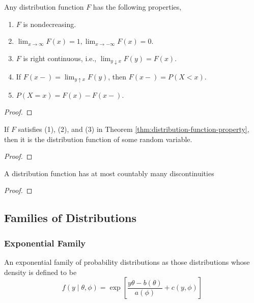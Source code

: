 \begin{theorem} \label{thm:distribution-function-property}
	Any distribution function $F$ has the following properties,
	\begin{enumerate}
		\item $F$ is nondecreasing.
		\item $\lim_{x\rightarrow\infty}F(x)=1,\lim_{x \rightarrow-\infty}F(x)=0$.
		\item $F$ is right continuous, i.e., $\lim_{y \downarrow x} F(y)=F(x)$.
		\item If $F(x-)=\lim_{y\uparrow x}F(y)$, then $F(x-)=P(X<x)$.
		\item $P(X=x)=F(x)-F(x-)$.
	\end{enumerate}
\end{theorem}

\begin{proof}

\end{proof}

\begin{theorem}
	If $F$ satisfies (1), (2), and (3) in Theorem \ref{thm:distribution-function-property}, then it is the distribution function of some random variable.
\end{theorem}

\begin{proof}

\end{proof}

\begin{theorem}
	A distribution function has at most countably many discontinuities
\end{theorem}

\begin{proof}

\end{proof}

\subsection{Families of Distributions}

\subsubsection{Exponential Family}

\begin{definition} \label{def:exponential-family}
	An exponential family of probability distributions as those distributions whose density is defined to be
	\begin{equation}
		f\left(y\mid\theta,\phi\right)=\exp\left[\frac{y\theta-b(\theta)}{a(\phi)}+c(y,\phi)\right]
	\end{equation}
\end{definition}

